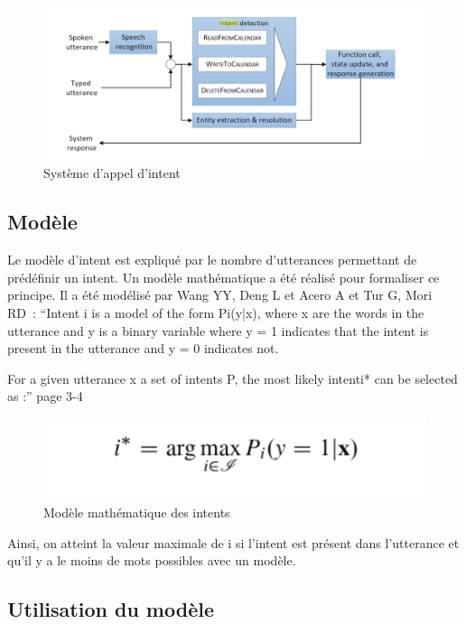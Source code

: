 	\begin{figure}[H]
	\centering
		\includegraphics[width = \textwidth]{appelIntent.png}
	\caption{Système d'appel d'intent}
	\label{fig:Système d'appel d'intent}
\end{figure}
	
	
\subsection{Modèle}

Le modèle d’intent est expliqué par le nombre d’utterances permettant de prédéfinir un intent. Un modèle mathématique a été réalisé pour formaliser ce principe. Il a été modélisé par Wang YY, Deng L et Acero A \cite{ref15} et Tur G, Mori RD\cite{ref15} : “Intent i is a model of the form Pi(y|x), where x are the words in the utterance and y is a binary variable where y = 1 indicates that the intent is present in the utterance and y = 0 indicates not. 
\vspace{1em}

For a given utterance x a set of intents P, the most likely intenti* can be selected as :” \cite{ref12} page 3-4
\vspace{1em}


\begin{figure}[H]
	\centering
		\includegraphics[width = 0.5 \textwidth]{formule.png}
	\caption{Modèle mathématique des intents}
	\label{fig:Modèle mathématique des intents}
\end{figure}
\vspace{1em}

Ainsi, on atteint la valeur maximale de i si l’intent est présent dans l’utterance et qu’il y a le moins de mots possibles avec un modèle.

\subsection{Utilisation du modèle}


